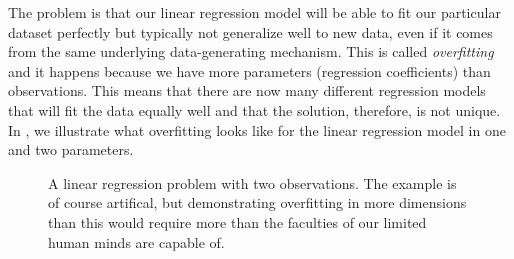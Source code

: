 The problem is that our linear regression model will be able to fit our particular dataset perfectly but typically not generalize well to new data, even if it comes from the same underlying data-generating mechanism. This is called \emph{overfitting} and it happens because we have more parameters (regression coefficients) than observations. This means that there are now many different regression models that will fit the data equally well and that the solution, therefore, is not unique. In , we illustrate what overfitting looks like for the linear regression model in one and two parameters.

\begin{figure}
  \centering
  \hfill%
  \caption{%
    A linear regression problem with two observations. The example is of course artifical, but demonstrating overfitting in more dimensions than this would require more than the faculties of our limited human minds are capable of.
  }
  \label{fig:overfitting}
\end{figure}

